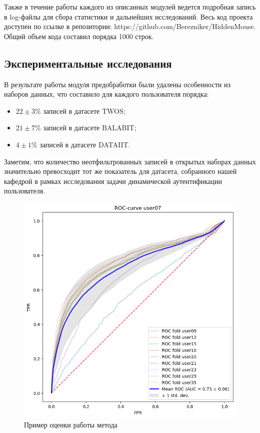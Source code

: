 \documentclass[12pt]{article}
\begin{document}
    \par Также в течение работы каждого из описанных модулей ведется подробная запись в log-файлы для сбора статистики и дальнейших исследований. Весь код проекта доступен по ссылке в репозитории: https://github.com/Berezniker/HiddenMouse. Общий объем кода составил порядка 1000 строк.


    \subsection{Экспериментальные исследования}
    \label{sec:PracticalPart:ExperimentalStudy}

    \par В результате работы модуля предобработки были удалены особенности из наборов данных, что составило для каждого пользователя порядка:

    \begin{itemize}
        \item $ 22 \pm 3 \% $ записей в датасете TWOS;
        \item $ 21 \pm 7 \% $ записей в датасете BALABIT; 
        \item $  4 \pm 1 \% $ записей в датасете DATAIIT.
    \end{itemize}

    \par Заметим, что количество неотфильтрованных записей в открытых наборах данных значительно превосходит тот же показатель для датасета, собранного нашей кафедрой в рамках исследования задачи динамической аутентификации пользователя.

    \begin{figure}[h]
        \centering
        \includegraphics[width=0.85\linewidth]{ROC_curve.png}
        \caption{Пример оценки работы метода}
        \label{sec:PracticalPart:Software:fig:ROC_curve}
    \end{figure}
\end{document}
